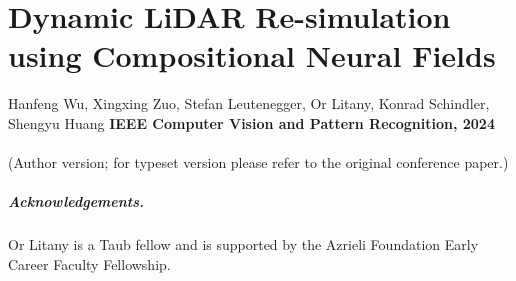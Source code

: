 \chapter[Dynamic LiDAR Re-simulation using Compositional Neural Fields]{Dynamic LiDAR Re-simulation using Compositional Neural Fields}
\label{chap:cvpr24}

Hanfeng Wu, Xingxing Zuo, Stefan Leutenegger, Or Litany, Konrad Schindler, Shengyu Huang
\textbf{IEEE Computer Vision and Pattern Recognition, 2024}\\
\\
(Author version; for typeset version please refer to the original conference paper.)\\

\providecommand{\subdir}{.}
\graphicspath{{\subdir/}}











\paragraph{Acknowledgements.}
{Or Litany is a Taub fellow and is supported by the Azrieli Foundation Early Career Faculty Fellowship.}